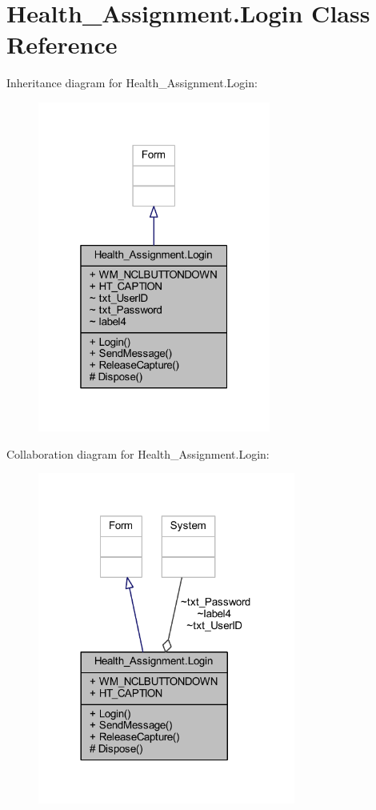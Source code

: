 \hypertarget{class_health___assignment_1_1_login}{}\section{Health\+\_\+\+Assignment.\+Login Class Reference}
\label{class_health___assignment_1_1_login}


Inheritance diagram for Health\+\_\+\+Assignment.\+Login\+:\nopagebreak
\begin{figure}[H]
\begin{center}
\leavevmode
\includegraphics[width=217pt]{class_health___assignment_1_1_login__inherit__graph}
\end{center}
\end{figure}


Collaboration diagram for Health\+\_\+\+Assignment.\+Login\+:\nopagebreak
\begin{figure}[H]
\begin{center}
\leavevmode
\includegraphics[width=240pt]{class_health___assignment_1_1_login__coll__graph}
\end{center}
\end{figure}
